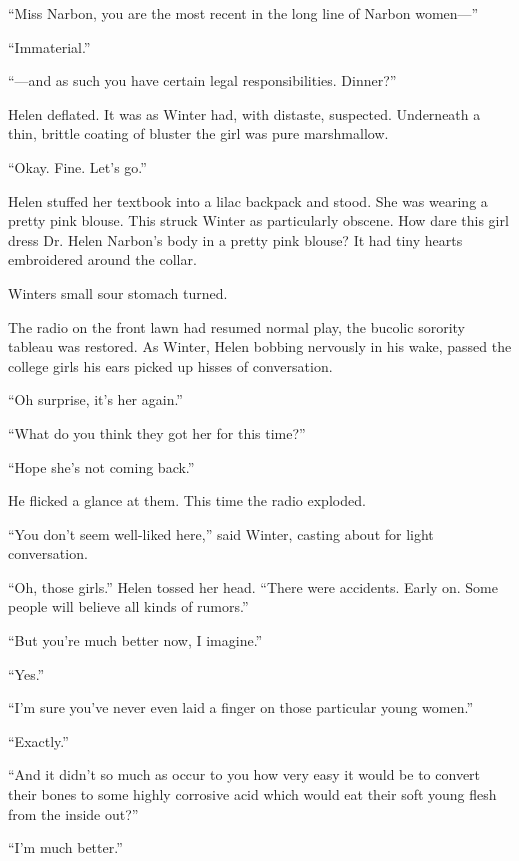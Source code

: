\documentclass[ebook,10pt]{memoir}
\begin{document}
``Miss Narbon, you are the most recent in the long line of Narbon
women---''

``Immaterial.''

``---and as such you have certain legal responsibilities. Dinner?''

Helen deflated. It was as Winter had, with distaste,
suspected. Underneath a thin, brittle coating of bluster the girl was
pure marshmallow.

``Okay. Fine. Let's go.''

Helen stuffed her textbook into a lilac backpack and stood. She was
wearing a pretty pink blouse. This struck Winter as particularly
obscene. How dare this girl dress Dr. Helen Narbon's body in a pretty
pink blouse? It had tiny hearts embroidered around the collar.

Winters small sour stomach turned.

The radio on the front lawn had resumed normal play, the bucolic
sorority tableau was restored. As Winter, Helen bobbing nervously in
his wake, passed the college girls his ears picked up hisses of
conversation.

``Oh surprise, it's her again.''

``What do you think they got her for this time?''

``Hope she's not coming back.''

He flicked a glance at them. This time the radio exploded. 

``You don't seem well-liked here,'' said Winter, casting about for
light conversation.

``Oh, those girls.'' Helen tossed her head. ``There were
accidents. Early on. Some people will believe all kinds of rumors.''

``But you're much better now, I imagine.''

``Yes.''

``I'm sure you've never even laid a finger on those particular young
women.''

``Exactly.''

``And it didn't so much as occur to you how very easy it would be to
convert their bones to some highly corrosive acid which would eat
their soft young flesh from the inside out?''

``I'm much better.''
\end{document}
